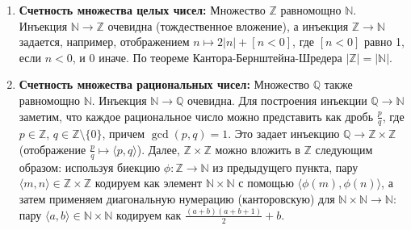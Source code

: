 \documentclass[11pt, a4paper]{extarticle}
\newcommand{\Z}{{\mathbb Z}}
\newcommand{\Q}{{\mathbb Q}}
\newcommand{\N}{{\mathbb N}}
\begin{document}
\begin{example}
\begin{enumerate}
    \item \textbf{Счетность множества целых чисел:} Множество $\Z$ равномощно $\N$. Инъекция $\N \to \Z$ очевидна (тождественное вложение), а инъекция $\Z \to \N$ задается, например, отображением $n \mapsto 2|n| + [n < 0]$, где $[n < 0]$ равно 1, если $n < 0$, и 0 иначе. По теореме Кантора-Бернштейна-Шредера $|\Z| = |\N|$.
    
    \item \textbf{Счетность множества рациональных чисел:} Множество $\Q$ также равномощно $\N$. Инъекция $\N \to \Q$ очевидна. Для построения инъекции $\Q \to \N$ заметим, что каждое рациональное число можно представить как дробь $\frac{p}{q}$, где $p \in \Z$, $q \in \Z \setminus \{0\}$, причем $\gcd(p,q) = 1$. Это задает инъекцию $\Q \to \Z \times \Z$ (отображение $\frac{p}{q} \mapsto \langle p,q \rangle$). Далее, $\Z \times \Z$ можно вложить в $\Z$ следующим образом: используя биекцию $\phi: \Z \to \N$ из предыдущего пункта, пару $\langle m,n \rangle \in \Z \times \Z$ кодируем как элемент $\N \times \N$ с помощью $\langle \phi(m), \phi(n) \rangle$, а затем применяем диагональную нумерацию (канторовскую) для $\N \times \N \to \N$: пару $\langle a,b \rangle \in \N \times \N$ кодируем как $\frac{(a+b)(a+b+1)}{2} + b$.
    
\end{enumerate}
\end{example}
\end{document}
